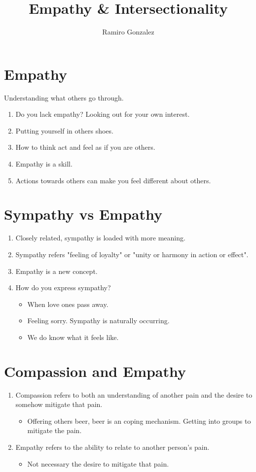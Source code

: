 \documentclass{article}
\title{Empathy \& Intersectionality}
\author{Ramiro Gonzalez }
\date{}
\begin{document}
\maketitle

\section*{Empathy}
Understanding what others go through. 
\begin{enumerate}
    \item Do you lack empathy?
    Looking out for your own interest. 
    \item Putting yourself in others shoes. 
    \item How to think act and feel as if you are others. 
    \item Empathy is a skill. 
    \item Actions towards others can make you feel different about others. 
\end{enumerate}
\section*{Sympathy vs Empathy}
\begin{enumerate}
    \item Closely related, sympathy is loaded with more meaning. 
    \item Sympathy refers "feeling of loyalty" or "unity or harmony in action or effect".
    \item Empathy is a new concept. 
    \item How do you express sympathy? 
        \begin{itemize}
            \item When love ones pass away. 
            \item Feeling sorry. Sympathy is naturally occurring.
            \item We do know what it feels like. 
        \end{itemize}
\end{enumerate}
\section*{Compassion and Empathy}
\begin{enumerate}
    \item Compassion refers to both an understanding of another pain and the desire to somehow mitigate that pain. 
    \begin{itemize}
        \item Offering others beer, beer is an coping mechanism. Getting into groups to mitigate the pain. 
    \end{itemize}
    \item Empathy refers to the ability to relate to another person's pain. 
        \begin{itemize}
            \item Not necessary the desire to mitigate that pain. 
        \end{itemize}
\end{enumerate}
\end{document}
